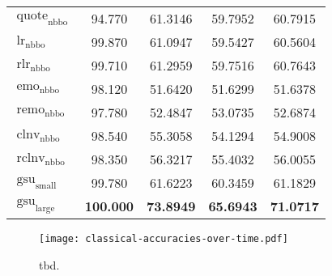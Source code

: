 \begin{table}
\begin{tabular}{lSSSS}
        $\operatorname{quote}_{\mathrm{nbbo}}$ & 94.770            & 61.3146                            & 59.7952           & 60.7915           \\
        $\operatorname{lr}_{\mathrm{nbbo}}$    & 99.870            & 61.0947                            & 59.5427           & 60.5604           \\
        $\operatorname{rlr}_{\mathrm{nbbo}}$   & 99.710            & 61.2959                            & 59.7516           & 60.7643           \\
        $\operatorname{emo}_{\mathrm{nbbo}}$   & 98.120            & 51.6420                            & 51.6299           & 51.6378           \\
        $\operatorname{remo}_{\mathrm{nbbo}}$  & 97.780            & 52.4847                            & 53.0735           & 52.6874           \\
        $\operatorname{clnv}_{\mathrm{nbbo}}$  & 98.540            & 55.3058                            & 54.1294           & 54.9008           \\
        $\operatorname{rclnv}_{\mathrm{nbbo}}$ & 98.350            & 56.3217                            & 55.4032           & 56.0055           \\\midrule
        $\operatorname{gsu}_{\mathrm{small}}$  & 99.780            & 61.6223                            & 60.3459           & 61.1829           \\
        $\operatorname{gsu}_{\mathrm{large}}$  & \bfseries 100.000 & \bfseries 73.8949                  & \bfseries 65.6943 & \bfseries 71.0717 \\\bottomrule
    \end{tabular}
\end{table}


\begin{figure}[ht]
    \centering
    \texttt{[image: classical-accuracies-over-time.pdf]}
    \caption[tbd]{tbd.}
    \label{fig:classical-accuracies-over-time}
\end{figure}


